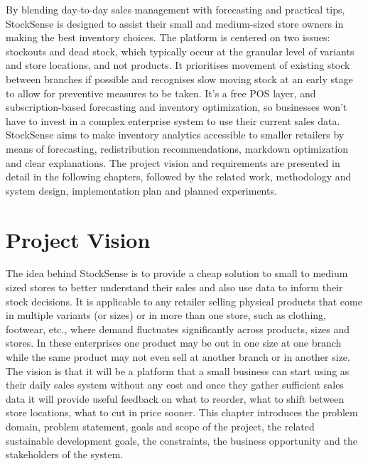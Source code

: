\documentclass{StockSense}
\begin{document}
By blending day-to-day sales management with forecasting and practical tips, StockSense is designed to assist their small and medium-sized store owners in making the best inventory choices. The platform is centered on two issues: stockouts and dead stock, which typically occur at the granular level of variants and store locations, and not products. It prioritises movement of existing stock between branches if possible and recognises slow moving stock at an early stage to allow for preventive measures to be taken. It's a free POS layer, and subscription-based forecasting and inventory optimization, so businesses won't have to invest in a complex enterprise system to use their current sales data. StockSense aims to make inventory analytics accessible to smaller retailers by means of forecasting, redistribution recommendations, markdown optimization and clear explanations. The project vision and requirements are presented in detail in the following chapters, followed by the related work, methodology and system design, implementation plan and planned experiments.


\chapter{Project Vision}

The idea behind StockSense is to provide a cheap solution to small to medium sized stores to better understand their sales and also use data to inform their stock decisions. It is applicable to any retailer selling physical products that come in multiple variants (or sizes) or in more than one store, such as clothing, footwear, etc., where demand fluctuates significantly across products, sizes and stores. In these enterprises one product may be out in one size at one branch while the same product may not even sell at another branch or in another size. The vision is that it will be a platform that a small business can start using as their daily sales system without any cost and once they gather sufficient sales data it will provide useful feedback on what to reorder, what to shift between store locations, what to cut in price sooner. This chapter introduces the problem domain, problem statement, goals and scope of the project, the related sustainable development goals, the constraints, the business opportunity and the stakeholders of the system.
\end{document}
